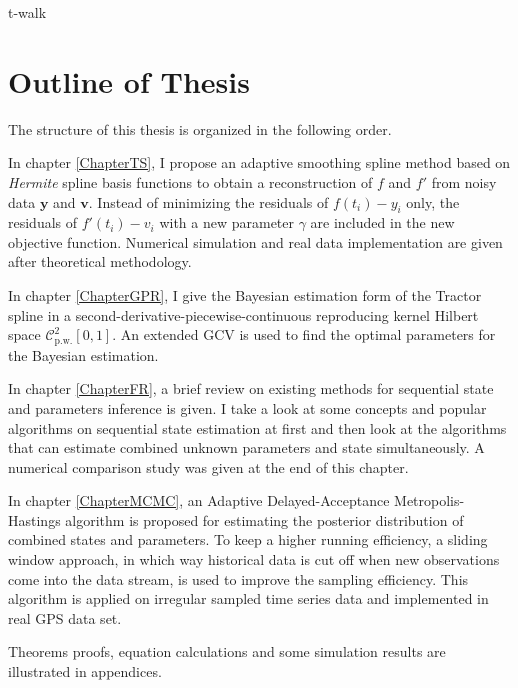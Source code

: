 t-walk




\section{Outline of Thesis}

The structure of this thesis is organized in the following order. 

In chapter \ref{ChapterTS}, I propose an adaptive smoothing spline method based on \textit{Hermite} spline basis functions to obtain a reconstruction of $f$ and $f'$ from noisy data $\mathbf{y}$ and $\mathbf{v}$. Instead of minimizing the residuals of $f(t_i)-y_i$ only, the residuals of $f'(t_i)-v_i$ with a new parameter $\gamma$ are included in the new objective function. Numerical simulation and real data implementation are given after theoretical methodology. 

In chapter \ref{ChapterGPR}, I give the Bayesian estimation form of the Tractor spline in a second-derivative-piecewise-continuous reproducing kernel Hilbert space $\mathcal{C}_{\mbox{p.w.}}^2[0,1]$. An extended GCV is used to find the optimal parameters for the Bayesian estimation. 

In chapter \ref{ChapterFR}, a brief review on existing methods for sequential state and parameters inference is given. I take a look at some concepts and popular algorithms on sequential state estimation at first and then look at the algorithms that can estimate combined unknown parameters and state simultaneously. A numerical comparison study was given at the end of this chapter. 

In chapter \ref{ChapterMCMC}, an Adaptive Delayed-Acceptance Metropolis-Hastings algorithm is proposed for estimating the posterior distribution of combined states and parameters. To keep a higher running efficiency, a sliding window approach, in which way historical data is cut off when new observations come into the data stream, is used to improve the sampling efficiency. This algorithm is applied on irregular sampled time series data and implemented in real GPS data set. 

Theorems proofs, equation calculations and some simulation results are illustrated in appendices. 
